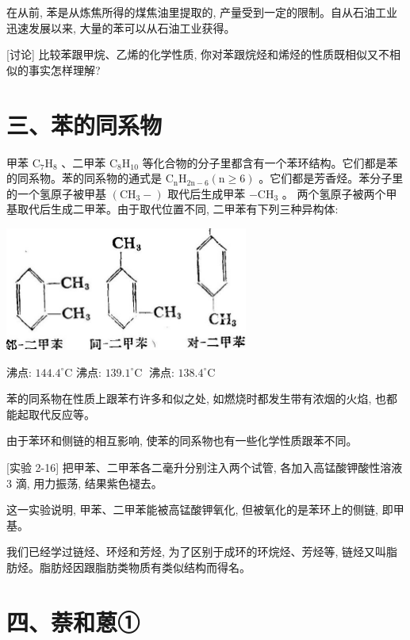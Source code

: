 \documentclass[10pt]{article}
\begin{document}
在从前, 苯是从炼焦所得的煤焦油里提取的, 产量受到一定的限制。自从石油工业迅速发展以来, 大量的苯可以从石油工业获得。

[讨论] 比较苯跟甲烷、乙烯的化学性质, 你对苯跟烷烃和烯烃的性质既相似又不相似的事实怎样理解?

\section*{三、苯的同系物}

甲苯 \({\mathrm{C}}_{7}{\mathrm{H}}_{8}\) 、二甲苯 \({\mathrm{C}}_{8}{\mathrm{H}}_{10}\) 等化合物的分子里都含有一个苯环结构。它们都是苯的同系物。苯的同系物的通式是 \({\mathrm{C}}_{\mathrm{n}}{\mathrm{H}}_{2\mathrm{n} - 6}\left( {\mathrm{n} \geq 6}\right)\) 。它们都是芳香烃。苯分子里的一个氢原子被甲基 \(\left( {{\mathrm{{CH}}}_{3} - }\right)\) 取代后生成甲苯 \(- {\mathrm{{CH}}}_{3}\) 。 两个氢原子被两个甲基取代后生成二甲苯。由于取代位置不同, 二甲苯有下列三种异构体:

\begin{center}
\includegraphics[max width=0.6\textwidth]{images/01912d16-be99-77bb-9535-4f3ed8d9946f_89_898771.jpg}
\end{center}

沸点: \({144.4}^{ \circ }\mathrm{C}\) 沸点: \({139.1}^{ \circ }\mathrm{C}\;\) 沸点: \({138.4}^{ \circ }\mathrm{C}\)

苯的同系物在性质上跟苯冇许多和似之处, 如燃烧时都发生带有浓烟的火焰, 也都能起取代反应等。

由于苯环和侧链的相互影响, 使苯的同系物也有一些化学性质跟苯不同。

[实验 2-16] 把甲苯、二甲苯各二毫升分别注入两个试管, 各加入高锰酸钾酸性溶液 3 滴, 用力振荡, 结果紫色褪去。

这一实验说明, 甲苯、二甲苯能被高锰酸钾氧化, 但被氧化的是苯环上的侧链, 即甲基。

我们已经学过链烃、环烃和芳烃, 为了区别于成环的环烷烃、芳烃等, 链烃又叫脂肪烃。脂肪烃因跟脂肪类物质有类似结构而得名。

\section*{四、萘和蒽①}
\end{document}
